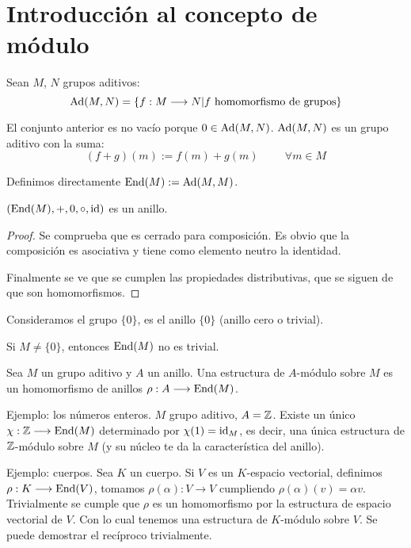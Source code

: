 \section{Introducción al concepto de módulo}

\begin{df}
  Sean \(M\), \(N\) grupos aditivos:
  \[
    \operatorname{Ad}(M,N)=\{f:M\longrightarrow N| f\textrm{ homomorfismo de grupos}\}
  \]
\end{df}

El conjunto anterior es no vacío porque \(0\in\operatorname{Ad}(M,N)\).
\(\operatorname{Ad}(M,N)\) es un grupo aditivo con la suma:
\[
  (f+g)(m):=f(m)+g(m)\hspace{1cm} \forall m\in M
\]


\begin{df}
  Definimos directamente \(\operatorname{End}(M):= \operatorname{Ad}(M,M)\).
\end{df}

\begin{prop}
  \((\operatorname{End}(M),+,0,\circ,\operatorname{id}) \) es un anillo.
\end{prop}
\begin{proof}
  Se comprueba que es cerrado para composición. Es obvio que la
  composición es asociativa y tiene como elemento neutro la identidad.

  Finalmente se ve que se cumplen las propiedades distributivas, que
  se siguen de que son homomorfismos.
\end{proof}


\begin{obs}
  Consideramos el grupo \(\{0\}\), es el anillo \(\{0\}\) (anillo
  cero o trivial).

  Si \(M\neq \{0\}\), entonces \(\operatorname{End}(M)\) no es trivial.
\end{obs}

\begin{df}[Módulo]
  Sea \(M\) un grupo aditivo y \(A\) un anillo. Una estructura de
  \(A\)-módulo sobre \(M\) es un homomorfismo de anillos
  \(\rho: A\longrightarrow\operatorname{End}(M)\).
\end{df}

Ejemplo: los números enteros. \(M\) grupo aditivo, \(A=\mathbb{Z}\).
Existe un único \(\chi:\mathbb{Z}\longrightarrow\operatorname{End}(M)\) determinado
por \(\chi(1)=\operatorname{id}_M\), es decir, una única estructura de
\(\mathbb{Z}\)-módulo sobre \(M\) (y su núcleo te da la
característica del anillo).

Ejemplo: cuerpos. Sea \(K\) un cuerpo.
Si \(V\) es un \(K\)-espacio vectorial, definimos \(\rho:K\longrightarrow
\operatorname{End}(V)\), tomamos \(\rho(\alpha):V\longrightarrow V\)
cumpliendo \(\rho(\alpha)(v)=\alpha v\). Trivialmente se cumple que
\(\rho\) es un homomorfismo por la estructura de espacio vectorial de \(V\).
Con lo cual tenemos una estructura de \(K\)-módulo sobre \(V\).
Se puede demostrar el recíproco trivialmente.

